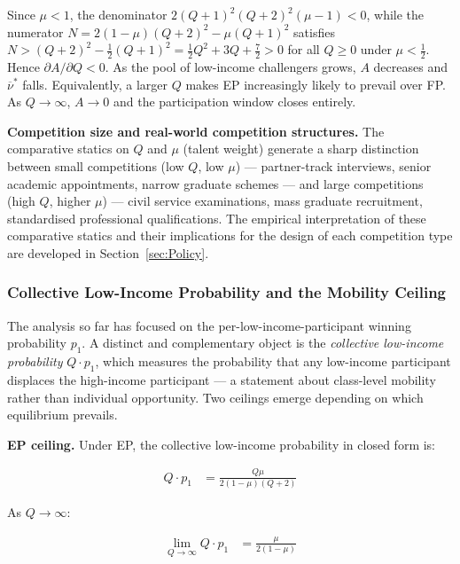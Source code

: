 \documentclass[
    oneside,
    fontsize=10pt,leqno]{article}
\begin{document}
Since $\mu<1$, the denominator
$2(Q+1)^{2}(Q+2)^{2}(\mu-1)<0$, while the numerator
$N=2(1-\mu)(Q+2)^{2}-\mu(Q+1)^{2}$ satisfies $N>(Q+2)^{2}-\tfrac{1}{2}(Q+1)^{2}=\tfrac{1}{2}Q^{2}+3Q+\tfrac{7}{2}>0$
for all $Q\geq0$ under $\mu<\tfrac{1}{2}$. Hence $\partial A/\partial Q<0$.
As the pool of low-income challengers grows, $A$ decreases and
$\overline{\nu}^{*}$ falls. Equivalently, a larger $Q$ makes EP
increasingly likely to prevail over FP. As $Q\to\infty$, $A\to0$
and the participation window closes entirely.

\medskip
\noindent\textbf{Competition size and real-world competition structures.}
The comparative statics on $Q$ and $\mu$ (talent weight) generate a sharp distinction
between small competitions (low $Q$, low $\mu$) --- partner-track
interviews, senior academic appointments, narrow graduate schemes ---
and large competitions (high $Q$, higher $\mu$) --- civil service
examinations, mass graduate recruitment, standardised professional
qualifications. The empirical interpretation of these comparative
statics and their implications for the design of each competition
type are developed in Section~\ref{sec:Policy}.

\subsubsection{\label{subsec:Mobility-Ceiling}Collective Low-Income Probability
and the Mobility Ceiling}

The analysis so far has focused on the per-low-income-participant winning
probability $p_{1}$. A distinct and complementary object is the
\emph{collective low-income probability} $Q\cdot p_{1}$, which measures
the probability that any low-income participant displaces the high-income participant --- a
statement about class-level mobility rather than individual opportunity.
Two ceilings emerge depending on which equilibrium prevails.

\medskip
\noindent\textbf{EP ceiling.} Under EP, the collective low-income
probability in closed form is:

\begin{align}
Q\cdot p_{1} & =\frac{Q\mu}{2(1-\mu)(Q+2)}\label{eq:collective}
\end{align}

As $Q\to\infty$:

\begin{align}
\lim_{Q\to\infty}Q\cdot p_{1} & =\frac{\mu}{2(1-\mu)}\label{eq:ceiling}
\end{align}
\end{document}
